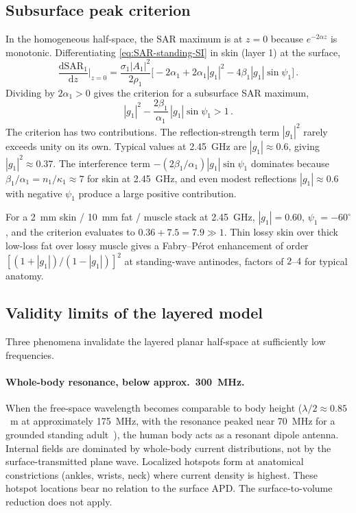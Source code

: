 \documentclass[journal,twocolumn,10pt]{IEEEtran}
\theoremstyle{plain}
\theoremstyle{remark}
\newcommand{\diff}{\mathrm{d}}
\begin{document}
\subsection{Subsurface peak criterion}
In the homogeneous half-space, the SAR maximum is at $z = 0$
because $e^{-2\alpha z}$ is monotonic. Differentiating
\eqref{eq:SAR-standing-SI} in skin (layer 1) at the surface,
\begin{equation}\label{eq:dSAR-dz-SI}
  \frac{\diff\mathrm{SAR}_1}{\diff z}\bigg|_{z=0}
  = \frac{\sigma_1 |A_1|^2}{2\rho_1}
  \bigl[-2\alpha_1 + 2\alpha_1|g_1|^2 - 4\beta_1|g_1|\sin\psi_1\bigr]\, .
\end{equation}
Dividing by $2\alpha_1 > 0$ gives the criterion for a subsurface
SAR maximum,
\begin{equation}\label{eq:subsurface-criterion-SI}
  |g_1|^2 - \frac{2\beta_1}{\alpha_1}\,|g_1|\sin\psi_1 > 1\, .
\end{equation}
The criterion has two contributions. The reflection-strength term
$|g_1|^2$ rarely exceeds unity on its own. Typical values at
2.45~GHz are $|g_1| \approx 0.6$, giving $|g_1|^2 \approx 0.37$.
The interference term $-(2\beta_1/\alpha_1)|g_1|\sin\psi_1$
dominates because $\beta_1/\alpha_1 = n_1/\kappa_1 \approx 7$ for
skin at 2.45~GHz, and even modest reflections $|g_1| \approx 0.6$
with negative $\psi_1$ produce a large positive contribution.

For a 2~mm skin / 10~mm fat / muscle stack at 2.45~GHz,
$|g_1| = 0.60$, $\psi_1 = -60^\circ$, and the criterion evaluates
to $0.36 + 7.5 = 7.9 \gg 1$. Thin lossy skin over thick low-loss
fat over lossy muscle gives a Fabry--P\'erot enhancement of order
$[(1+|g_1|)/(1-|g_1|)]^2$ at standing-wave antinodes, factors of
$2$--$4$ for typical anatomy.

\subsection{Validity limits of the layered model}
Three phenomena invalidate the layered planar half-space at
sufficiently low frequencies.

\paragraph{Whole-body resonance, below approx.\ 300~MHz.}
When the free-space wavelength becomes comparable to body height
($\lambda/2 \approx 0.85$~m at approximately 175~MHz, with the resonance
peaked near 70~MHz for a grounded standing
adult~\cite{Durney1986}), the human body acts as a resonant dipole
antenna. Internal fields are dominated by whole-body current
distributions, not by the surface-transmitted plane wave. Localized
hotspots form at anatomical constrictions (ankles, wrists, neck)
where current density is highest. These hotspot locations bear no
relation to the surface \gls{APD}. The
surface-to-volume reduction does not apply.
\end{document}

